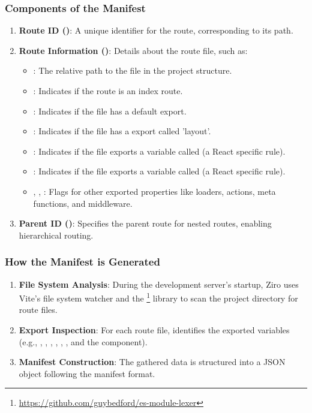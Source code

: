 \pagebreak

\subsubsection{Components of the Manifest}
\begin{enumerate}
  \item \textbf{Route ID ()}: A unique identifier for the route, corresponding to its path.
  \item \textbf{Route Information ()}: Details about the route file, such as:
  \begin{itemize}
    \item {}: The relative path to the file in the project structure.
    \item {}: Indicates if the route is an index route.
    \item {}: Indicates if the file has a default export.
    \item {}: Indicates if the file has a export called 'layout'.
    \item {}: Indicates if the file exports a variable called  (a React specific rule).
    \item {}: Indicates if the file exports a variable called  (a React specific rule).
    \item {}, , : Flags for other exported properties like loaders, actions, meta functions, and middleware.
  \end{itemize}

  \item  \textbf{Parent ID ()}: Specifies the parent route for nested routes, enabling hierarchical routing.
\end{enumerate}

\subsubsection{How the Manifest is Generated}
\begin{enumerate}
  \item \textbf{File System Analysis}: During the development server's startup, Ziro uses Vite's file system watcher and the \footnote{\url{https://github.com/guybedford/es-module-lexer}} library to scan the project directory for route files.
  \item \textbf{Export Inspection}: For each route file,  identifies the exported variables (e.g., , , , , , , and the  component).
  \item \textbf{Manifest Construction}: The gathered data is structured into a JSON object following the manifest format.
\end{enumerate}

